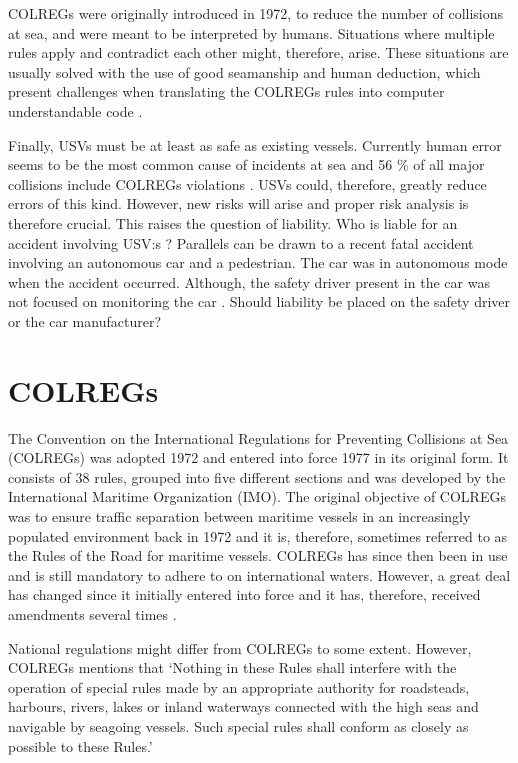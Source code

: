 COLREGs were originally introduced in 1972, to reduce the number of collisions at sea, and were meant to be interpreted by humans. Situations where multiple rules apply and contradict each other might, therefore, arise. These situations are usually solved with the use of good seamanship and human deduction, which present challenges when translating the COLREGs rules into computer understandable code \cite{benjamin2006method}.

Finally, USVs must be at least as safe as existing vessels. Currently human error  seems to be the most common cause of incidents at sea \cite{chauvin2011human,roberts2014fatal,uugurlu2015analysis} and 56 \% of all major collisions include COLREGs violations \cite{statheros2008autonomous}. USVs could, therefore, greatly reduce errors of this kind. However, new risks will arise and proper risk analysis is therefore crucial. This raises the question of liability. Who is liable for an accident involving USV:s \cite{jokioinen2016remote}? Parallels can be drawn to a recent fatal accident involving an autonomous car and a pedestrian. The car was in autonomous mode when the accident occurred. Although, the safety driver present in the car was not focused on monitoring the car \cite{uber_accident_liab}. Should liability be placed on the safety driver or the car manufacturer?

\chapter{COLREGs}
\label{sec_colreg}
The Convention on the International Regulations for Preventing Collisions at Sea (COLREGs) was adopted 1972 and entered into force 1977 in its original form. It consists of 38 rules, grouped into five different sections and was developed by the International Maritime Organization (IMO).
The original objective of COLREGs was to ensure traffic separation between maritime vessels in an increasingly populated environment back in 1972 and it is, therefore, sometimes referred to as the Rules of the Road for maritime vessels. COLREGs has since then been in use and is still mandatory to adhere to on international waters. However, a great deal has changed since it initially entered into force and it has, therefore, received amendments several times \cite{colreg_about_imo}.

National regulations might differ from COLREGs to some extent. However, COLREGs mentions that ‘Nothing in these Rules shall interfere with the operation of special rules made by an appropriate authority for roadsteads, harbours, rivers, lakes or inland waterways connected with the high seas and navigable by seagoing vessels.
Such special rules shall conform as closely as possible to these Rules.’ \cite{colreg}

